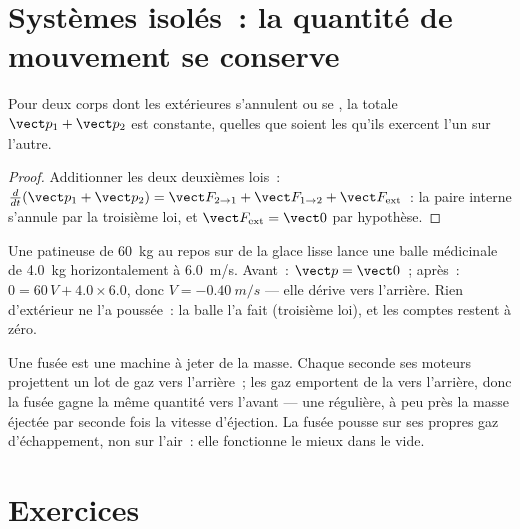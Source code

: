 \section{Systèmes isolés~: la quantité de mouvement se conserve}

\begin{proposition}\label{prop:g12:newtons-laws:conservation}
Pour deux corps dont les  extérieures s'annulent ou
se , la 
totale $\vect p_1 + \vect p_2$ est constante, quelles que soient les
 qu'ils exercent l'un sur l'autre.
\end{proposition}

\begin{proof}
Additionner les deux deuxièmes lois~:
$\frac{d}{dt}(\vect p_1 + \vect p_2) = \vect F_{2 \to 1} +
\vect F_{1 \to 2} + \vect F_{\text{ext}}$~: la paire interne s'annule
par la troisième loi, et $\vect F_{\text{ext}} = \vect 0$ par hypothèse.
\end{proof}

\begin{example}[Recul]\label{ex:g12:newtons-laws:recoil}
Une patineuse de \qty{60}{kg} au repos sur de la glace lisse lance une
balle médicinale de \qty{4.0}{kg} horizontalement à \qty{6.0}{m/s}.
Avant~: $\vect p = \vect 0$~; après~:
$0 = 60\,V + 4.0 \times 6.0$, donc $V = \qty{-0.40}{m/s}$ --- elle
dérive vers l'arrière. Rien d'extérieur ne l'a poussée~: la balle l'a
fait (troisième loi), et les comptes restent à zéro.
\end{example}

\begin{remark}\label{rem:g12:newtons-laws:rocket}
Une fusée est une machine à jeter de la masse. Chaque seconde ses
moteurs projettent un lot de gaz vers l'arrière~; les gaz emportent de
la  vers l'arrière, donc la fusée
gagne la même quantité vers l'avant --- une 
régulière, à peu près la masse éjectée par seconde fois la vitesse
d'éjection. La fusée pousse sur ses propres gaz d'échappement, non sur
l'air~: elle fonctionne le mieux dans le vide.
\end{remark}

\section{Exercices}


